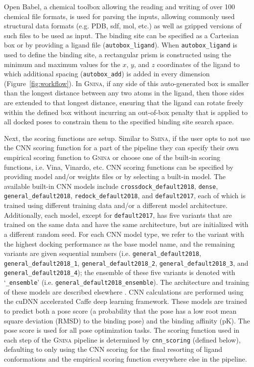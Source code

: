 \documentclass[journal=jcisd8,manuscript=article]{achemso}
\begin{document}
Open Babel\cite{o2011open,babelopen}, a chemical toolbox allowing the reading and writing of over 100 chemical file formats, is used for parsing the inputs, allowing commonly used structural data formats (e.g. PDB, sdf, mol, etc.) as well as gzipped versions of such files to be used as input. The binding site can be specified as a Cartesian box or by providing a ligand file (\texttt{autobox\_ligand}).  When \texttt{autobox\_ligand} is used to define the binding site, a rectangular prism is constructed using the minimum and maximum values for the $x$, $y$, and $z$ coordinates of the ligand to which additional spacing (\texttt{autobox\_add}) is added in every dimension (Figure~\ref{fig:workflow}). In \textsc{Gnina}, if any side of this auto-generated box is smaller than the longest distance between any two atoms in the ligand, then those sides are extended to that longest distance, ensuring that the ligand can rotate freely within the defined box without incurring an out-of-box penalty that is applied to all docked poses to constrain them to the specified binding site search space.

Next, the scoring functions are setup. Similar to \textsc{Smina}, if the user opts to not use the CNN scoring function for a part of the pipeline they can specify their own empirical scoring function to \textsc{Gnina} or choose one of the built-in scoring functions, i.e. Vina, Vinardo\cite{quiroga2016vinardo}, etc. CNN scoring functions can be specified by providing model and/or weights files or by selecting a built-in model.  The available built-in CNN models include \texttt{crossdock\_default2018}, \texttt{dense}, \texttt{general\_default2018}, \texttt{redock\_default2018}, and \texttt{default2017}, each of which is trained using different training data and/or a different model architecture. Additionally, each model, except for \texttt{default2017}, has five variants that are trained on the same data and have the same architecture, but are initialized with a different random seed. For each CNN model type, we refer to the variant with the highest docking performance as the base model name, and the remaining variants are given sequential numbers (i.e. \texttt{general\_default2018}, \texttt{general\_default2018\_1}, \texttt{general\_default2018\_2}, \texttt{general\_default2018\_3}, and \texttt{general\_default2018\_4}); the ensemble of these five variants is denoted with `\texttt{\_ensemble}' (i.e. \texttt{general\_default2018\_ensemble}). The architecture and training of these models are described elsewhere \cite{francoeur2020three,Ragoza2017}. CNN calculations are performed using the cuDNN accelerated Caffe deep learning framework\cite{jia2014caffe}. These models are trained to predict both a pose score (a probability that the pose has a low root mean square deviation (RMSD) to the binding pose) and the binding affinity (pK). The pose score is used for all pose optimization tasks. The scoring function used in each step of the \textsc{Gnina} pipeline is determined by \texttt{cnn\_scoring} (defined below), defaulting to only using the CNN scoring for the final resorting of ligand conformations and the empirical scoring function everywhere else in the pipeline. 
\end{document}
